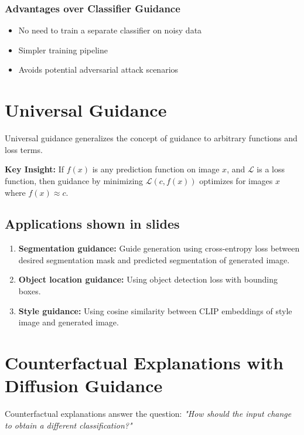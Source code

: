 \subsubsection*{Advantages over Classifier Guidance}
\begin{itemize}
    \item No need to train a separate classifier on noisy data
    \item Simpler training pipeline
    \item Avoids potential adversarial attack scenarios
\end{itemize}
\section{Universal Guidance}

Universal guidance generalizes the concept of guidance to arbitrary functions and loss terms.

\textbf{Key Insight:} If $f(x)$ is any prediction function on image $x$, and $\mathcal{L}$ is a loss function, then guidance by minimizing $\mathcal{L}(c, f(x))$ optimizes for images $x$ where $f(x) \approx c$.

\subsection*{Applications shown in slides}
\begin{enumerate}
    \item \textbf{Segmentation guidance:} Guide generation using cross-entropy loss between desired segmentation mask and predicted segmentation of generated image.
    \item \textbf{Object location guidance:} Using object detection loss with bounding boxes.
    \item \textbf{Style guidance:} Using cosine similarity between CLIP embeddings of style image and generated image.
\end{enumerate}

\section{Counterfactual Explanations with Diffusion Guidance}

Counterfactual explanations answer the question: \textit{"How should the input change to obtain a different classification?"}

